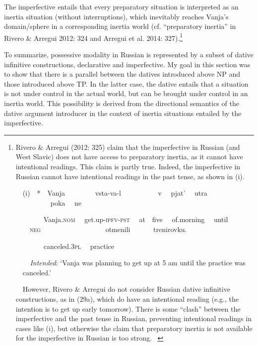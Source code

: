 \documentclass[12pt]{article}
\newenvironment{styleStandard}{\setlength\leftskip{0cm}\setlength\rightskip{0cm plus 1fil}\setlength\parindent{0cm}\setlength\parfillskip{0pt plus 1fil}\setlength\parskip{0in plus 1pt}\writerlistparindent\writerlistleftskip\leavevmode\normalfont\normalsize\writerlistlabel\ignorespaces}{\unskip\vspace{0.111in plus 0.0111in}\par}
\newcommand\writerlistleftskip{}
\newcommand\writerlistparindent{}
\newcommand\writerlistlabel{}
\begin{document}
\begin{styleStandard}
The imperfective entails that every preparatory situation is interpreted as an inertia situation (without interruptions), which inevitably reaches Vanja’s domain/sphere in a corresponding inertia world (cf. “preparatory inertia” in Rivero \& Arregui 2012: 324 and Arregui et al. 2014: 327).\footnote{ Rivero \& Arregui (2012: 325) claim that the imperfective in Russian (and West Slavic) does not have access to preparatory inertia, as it cannot have intentional readings. This claim is partly true. Indeed, the imperfective in Russian cannot have intentional readings in the past tense, as shown in (i). \par \ \ (i)\ \ *\ \ Vanja \ \ \ \ \ \ \ \ vsta-va-l \ \ \ \ \ \ \ \ \ \ v \ \ pjat’ \ \ utra \ \ \ \ \ \ \ \ \ \ poka \ \ ne \ \ \ \ \par \ \ \ \ \ \ \ \ Vanja.\textsc{nom} \ \ get.up-\textsc{ipfv-pst} \ \ at\ \ five \ \ of.morning \ \ until \ \ \ \ \textsc{neg} \ \ \ \ \ \ \ \ \ \ \ \ \ \ \ \ \ \ otmenili \ \ \ \ \ \ trenirovku.\par \ \ \ \ \ \ \ \ canceled.\textsc{3pl} \ \ practice\textit{ }\par \textit{\ \ \ \ Intended}: ‘Vanja was planning to get up at 5 am until the practice was \ \ canceled.’ \ \par \ \ However, Rivero \& Arregui do not consider Russian dative infinitive constructions, as in (29a), which do have an intentional reading (e.g., the intention is to get up early tomorrow). There is some “clash” between the imperfective and the past tense in Russian, preventing intentional readings in cases like (i), but otherwise the claim that preparatory inertia is not available for the imperfective in Russian is too strong. \ }
\end{styleStandard}

\begin{styleStandard}
To summarize, possessive modality in Russian is represented by a subset of dative infinitive constructions, declarative and imperfective. My goal in this section was to show that there is a parallel between the datives introduced above NP and those introduced above TP. In the latter case, the dative entails that a situation is not under control in the actual world, but can be brought under control in an inertia world. This possibility is derived from the directional semantics of the dative argument introducer in the context of inertia situations entailed by the imperfective.
\end{styleStandard}
\end{document}
